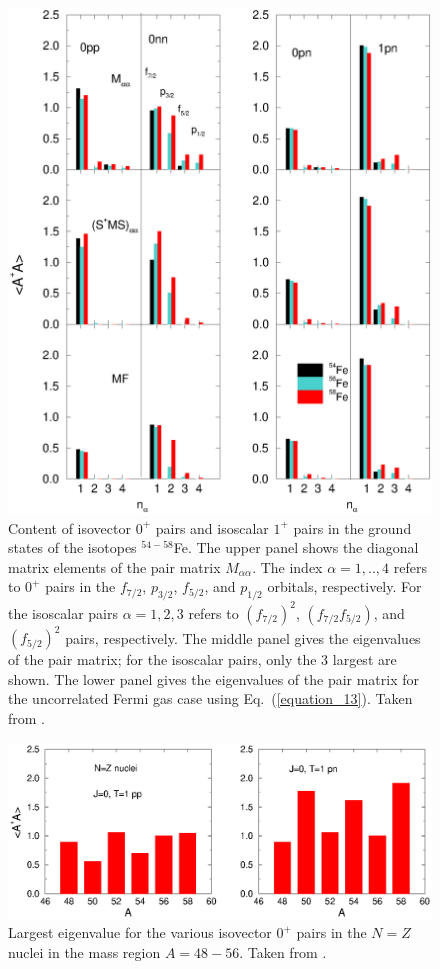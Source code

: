 \documentclass[rmp,aps,floatfix]{revtex4}
\begin{document}
\clearpage
\begin{figure}
\includegraphics[scale=0.5,angle=0]{dean_hjorthjensen_fig17.ps}
\caption{Content of isovector $0^+$ pairs and isoscalar $1^+$ pairs
in the ground states of the isotopes
$^{54-58}$Fe. The upper panel shows the
diagonal matrix elements of the pair matrix $M_{\alpha\alpha}$.
The index $\alpha=1,..,4$ refers to $0^+$ pairs in the
$f_{7/2}$, $p_{3/2}$, $f_{5/2}$, and $p_{1/2}$ orbitals, respectively.
For the isoscalar pairs $\alpha=1,2,3$ refers to $(f_{7/2})^2$,
$(f_{7/2}f_{5/2})$, and $(f_{5/2})^2$ pairs, respectively.
The middle panel gives the eigenvalues of the pair matrix; for the
isoscalar pairs, only the 3 largest are shown. The lower panel
gives the eigenvalues of the pair matrix for the uncorrelated Fermi gas case
using Eq.~(\ref{equation_13}). Taken from  \protect\cite{Langanke95b}.\label{fig_88}}

\end{figure}

\begin{figure}
\includegraphics[scale=0.5,angle=0]{dean_hjorthjensen_fig18.ps}
\caption{Largest eigenvalue for the various isovector $0^+$ pairs
in the $N=Z$ nuclei in the mass region $A=48-56$. 
Taken from \cite{langanke97}.}
\label{fig_89}
\end{figure}
\end{document}
